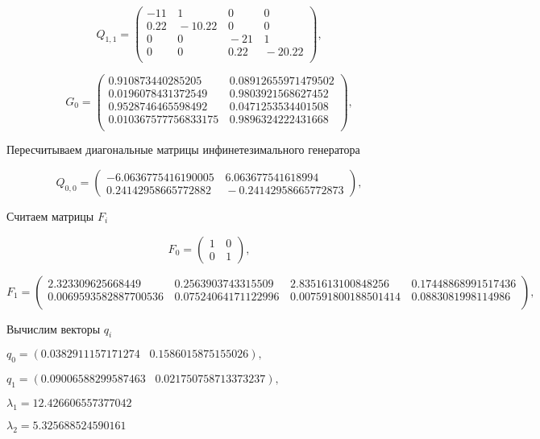 \documentclass[12pt, a4paper]{article}
\begin{document}
    $$
Q_{1,1} = \left(\begin{array}{cccc}
-11 & \,1 & \,0 & \,0  \\
0.22 & \,-10.22 & \,0 & \,0  \\
0 & \,0 & \,-21& \,1  \\
0 & \,0 & \,0.22 & \,-20.22  \\
\end{array}\right),
$$


 $$
G_0 = \left(\begin{array}{cc}
0.910873440285205& \,0.08912655971479502  \\
0.0196078431372549 & \,0.9803921568627452  \\
0.9528746465598492 & \,0.0471253534401508\\
0.010367577756833175 & \,0.9896324222431668 \\
\end{array}\right),
$$

Пересчитываем диагональные матрицы инфинетезимального генератора

    $$
Q_{0,0} = \left(\begin{array}{cc}
-6.0636775416190005 & \,6.063677541618994 \\
0.24142958665772882 & \,-0.24142958665772873 
\end{array}\right),
$$

Считаем матрицы $F_i$

    $$
F_0 = \left(\begin{array}{cc}
1 & \,0\\
0 & \,1
\end{array}\right),
$$



$$
F_1 = \left(\begin{array}{cccc}
2.323309625668449 & \,0.2563903743315509 & \,2.8351613100848256& \,0.17448868991517436   \\
0.0069593582887700536& \,0.07524064171122996 & \,0.007591800188501414 & \,0.0883081998114986   \\
\end{array}\right),
$$

Вычислим векторы $q_i$

$
q_0 = (0.0382911157171274  \;\;\;0.1586015875155026),
$

$
q_1 = (0.09006588299587463  \;\;\; 0.021750758713373237),
$

$\lambda_1 = 12.426606557377042$

$\lambda_2 = 5.325688524590161$
\end{document}
